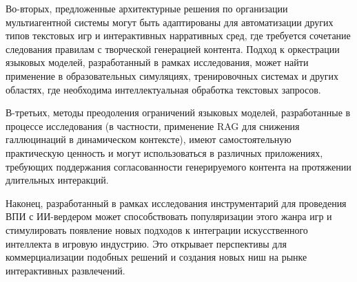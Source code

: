Во-вторых, предложенные архитектурные решения по организации мультиагентной системы могут быть адаптированы для автоматизации других типов текстовых игр и интерактивных нарративных сред, где требуется сочетание следования правилам с творческой генерацией контента. Подход к оркестрации языковых моделей, разработанный в рамках исследования, может найти применение в образовательных симуляциях, тренировочных системах и других областях, где необходима интеллектуальная обработка текстовых запросов.

В-третьих, методы преодоления ограничений языковых моделей, разработанные в процессе исследования (в частности, применение RAG для снижения галлюцинаций в динамическом контексте), имеют самостоятельную практическую ценность и могут использоваться в различных приложениях, требующих поддержания согласованности генерируемого контента на протяжении длительных интеракций.

Наконец, разработанный в рамках исследования инструментарий для проведения ВПИ с ИИ-вердером может способствовать популяризации этого жанра игр и стимулировать появление новых подходов к интеграции искусственного интеллекта в игровую индустрию. Это открывает перспективы для коммерциализации подобных решений и создания новых ниш на рынке интерактивных развлечений.